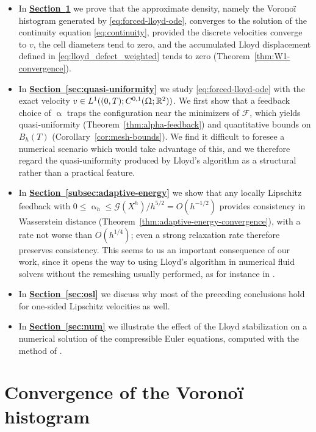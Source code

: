 \documentclass[letterpaper,11pt,twoside]{article}
\numberwithin{figure}{section}
\numberwithin{table}{section}
\theoremstyle{cpamplain}
\theoremstyle{cpamdefinition}
\newcommand{\R}{\mathbb{R}}
\newcommand{\Secref}[1]{\textbf{\hyperref[#1]{Section~\ref*{#1}}}}
\let\alpha\upalpha
\let\Omega\Upomega
\renewcommand{\leq}{\leqslant}
\numberwithin{equation}{section}
\begin{document}
\begin{itemize}
\item
In \Secref{sec:convergence} we prove that the approximate density, namely the Vorono\"i histogram generated by \eqref{eq:forced-lloyd-ode}, converges to the solution of the continuity equation \eqref{eq:continuity}, provided the discrete velocities converge to $v$, the cell diameters tend to zero, and the accumulated Lloyd displacement defined in \eqref{eq:lloyd_defect_weighted} tends to zero (Theorem~\ref{thm:W1-convergence}).
\smallskip

\item
In \Secref{sec:quasi-uniformity} we study \eqref{eq:forced-lloyd-ode} with the exact velocity $v\in L^1((0,T);C^{0,1}(\Omega;\R^2))$.
We first show that a feedback choice of $\alpha$ traps the configuration near the minimizers of $\mathscr F$, which yields quasi-uniformity (Theorem~\ref{thm:alpha-feedback}) and quantitative bounds on $B_h(T)$ (Corollary~\ref{cor:mesh-bounds}).
We find it difficult to foresee a numerical scenario which would take advantage of this, and we therefore regard the quasi-uniformity produced by Lloyd's algorithm as a structural rather than a practical feature.
\smallskip

\item In \Secref{subsec:adaptive-energy} we show that any locally Lipschitz feedback with
$0\leq \alpha_h\leq \mathscr G(X^h)/h^{5/2}=O(h^{-1/2})$
provides consistency in Wasserstein distance (Theorem~\ref{thm:adaptive-energy-convergence}), with a rate not worse than $O(h^{1/4})$; even a strong relaxation rate therefore preserves consistency.
This seems to us an important consequence of our work, since it opens the way to using Lloyd's algorithm in numerical fluid solvers without the remeshing usually performed, as for instance in \cite{shasha,loulou}.
\smallskip

\item
In \Secref{sec:osl} we discuss why most of the preceding conclusions hold for one-sided Lipschitz velocities as well.
\smallskip

\item
In \Secref{sec:num} we illustrate the effect of the Lloyd stabilization on a numerical solution of the compressible Euler equations, computed with the method of \cite{despres2024,desprem}. 
\end{itemize}


\section{Convergence of the Vorono\"i histogram}\label{sec:convergence}
\end{document}
